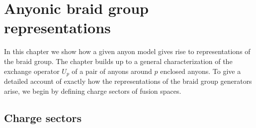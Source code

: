 \documentclass[a4paper,10pt,oneside]{book}
\theoremstyle{plain}
\theoremstyle{definition}
\theoremstyle{remark}
\begin{document}
\clearpage






































































\chapter{Anyonic braid group representations}

In this chapter we show how a given anyon model gives rise to representations of the braid group. The chapter builds up to a general characterization of the exchange operator $U_p$ of a pair of anyons around $p$ enclosed anyons. To give a detailed account of exactly how the representations of the braid group generators arise, we begin by defining charge sectors of fusion spaces.


\section{Charge sectors}\label{sec:charge sectors}
\end{document}
